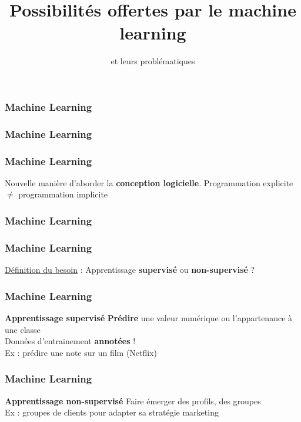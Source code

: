 \documentclass{formation}
\title{Possibilités offertes par le machine learning}
\subtitle{et leurs problématiques}
\begin{document}
\maketitle

\begin{frame}
  \frametitle{Machine Learning}
\end{frame}

\begin{frame}
  \frametitle{Machine Learning}
\end{frame}

\begin{frame}
  \frametitle{Machine Learning}
  Nouvelle manière d'aborder la \textbf{conception logicielle}.
  \newline
  \newline
  Programmation explicite $\neq$ programmation implicite
\end{frame}

\begin{frame}
  \frametitle{Machine Learning}
\end{frame}

\begin{frame}
  \frametitle{Machine Learning}
  \underline{Définition du besoin} :
  \newline
  \newline
  Apprentissage \textbf{supervisé} ou \textbf{non-supervisé} ?
\end{frame}

\begin{frame}
  \frametitle{Machine Learning}
  \textbf{Apprentissage supervisé}
  \newline \newline
  \textbf{Prédire} une valeur numérique ou l'appartenance à une classe\\
  \newline
  Données d'entrainement \textbf{annotées} ! \\
  \newline
  Ex : prédire une note sur un film (Netflix)
\end{frame}

\begin{frame}
  \frametitle{Machine Learning}
  \textbf{Apprentissage non-supervisé}
  \newline \newline
  Faire émerger des profils, des groupes \\
  \newline
  Ex : groupes de clients pour adapter sa stratégie marketing \\
\end{frame}
\end{document}
